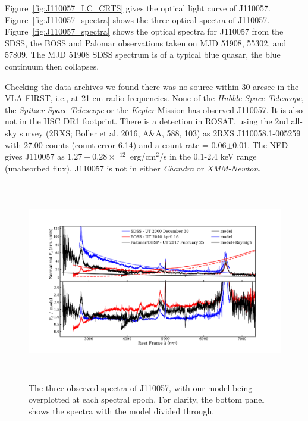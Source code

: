 \documentclass{nature}
\begin{document}
Figure~\ref{fig:J110057_LC_CRTS} gives the optical light curve of
J110057.  Figure~\ref{fig:J110057_spectra} shows the three optical
spectra of J110057. Figure~\ref{fig:J110057_spectra} shows the optical
spectra for J110057 from the SDSS, the BOSS and Palomar observations
taken on MJD 51908, 55302, and 57809. The MJD 51908 SDSS spectrum is
of a typical blue quasar, the blue continuum then collapses.

Checking the data archives we found there was no source within 30
arcsec in the VLA FIRST, i.e., at 21 cm radio frequencies.  None of
the {\it Hubble Space Telescope}, the {\it Spitzer Space Telescope} or
the {\it Kepler} Mission has observed J110057.  It is also not in the
HSC DR1 footprint.  There is a detection in ROSAT, using the 2nd
all-sky survey (2RXS; Boller et al. 2016, A\&A, 588, 103) as 2RXS
J110058.1-005259 with 27.00 counts (count error 6.14) and a count rate
= 0.06$\pm$0.01. The NED gives J110057 as $1.27\pm0.28 \times^{-12}$
erg/cm$^{2}$/s in the 0.1-2.4 keV range (unabsorbed flux). J110057 is
not in either {\it Chandra} or {\it XMM-Newton}.




\begin{figure}
  \includegraphics[width=15.4cm, height=8.75cm, trim=0.0cm 0.0cm 0.0cm 0.0cm, clip]
  {../plots/models/mcd_gap_v3_20171016v1.pdf}
  \centering
  \caption[]{The three observed spectra of J110057, with our model
    being overplotted at each spectral epoch. For clarity, the bottom
    panel shows the spectra with the model divided through. }
  \label{fig:J110057_diskmodel}
\end{figure}
\end{document}
